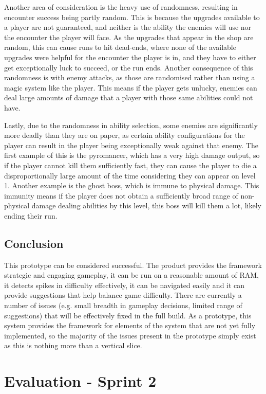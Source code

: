 Another area of consideration is the heavy use of randomness, resulting in encounter success being partly random. This is because the upgrades available to a player are not guaranteed, and neither is the ability the enemies will use nor the encounter the player will face. As the upgrades that appear in the shop are random, this can cause runs to hit dead-ends, where none of the available upgrades were helpful for the encounter the player is in, and they have to either get exceptionally luck to succeed, or the run ends. Another consequence of this randomness is with enemy attacks, as those are randomised rather than using a magic system like the player. This means if the player gets unlucky, enemies can deal large amounts of damage that a player with those same abilities could not have. 

Lastly, due to the randomness in ability selection, some enemies are significantly more deadly than they are on paper, as certain ability configurations for the player can result in the player being exceptionally weak against that enemy. The first example of this is the pyromancer, which has a very high damage output, so if the player cannot kill them sufficiently fast, they can cause the player to die a disproportionally large amount of the time considering they can appear on level 1. Another example is the ghost boss, which is immune to physical damage. This immunity means if the player does not obtain a sufficiently broad range of non-physical damage dealing abilities by this level, this boss will kill them a lot, likely ending their run. 

\subsection{Conclusion}

This prototype can be considered successful. The product provides the
framework strategic and engaging gameplay, it can be run on a reasonable
amount of RAM, it detects spikes in difficulty effectively, it can be
navigated easily and it can provide suggestions that help balance game
difficulty. There are currently a number of issues (e.g. small breadth
in gameplay decisions, limited range of suggestions) that will be
effectively fixed in the full build. As a prototype, this system
provides the framework for elements of the system that are not yet fully
implemented, so the majority of the issues present in the prototype
simply exist as this is nothing more than a vertical slice.

\section{Evaluation - Sprint 2}

